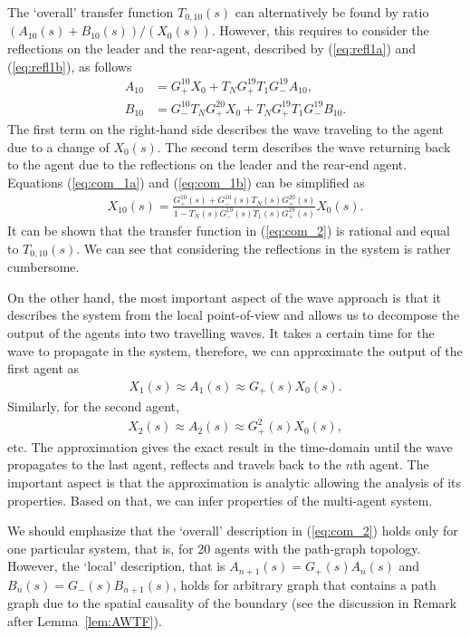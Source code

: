 \documentclass[10pt,twocolumn,twoside]{IEEEtran}
\theoremstyle{definition}
\begin{document}
The `overall' transfer function $T_{0,10}(s)$ can alternatively be found by ratio $(A_{10}(s)+B_{10}(s))/(X_0(s))$. However, this requires to consider the reflections on the leader and the rear-agent, described by (\ref{eq:refl1a}) and (\ref{eq:refl1b}), as follows
\begin{align}
A_{10} &= G_+^{10}X_0+ T_N G_+^{19} T_1 G_-^{19}A_{10},\label{eq:com_1a}\\
  B_{10} &= G_-^{10}T_N G_+^{20}X_0+ T_N G_+^{19} T_1 G_-^{19}B_{10}.\label{eq:com_1b}
\end{align}
The first term on the right-hand side describes the wave traveling to the agent due to a change of $X_0(s)$. The second term describes the wave returning back to the agent due to the reflections on the leader and the rear-end agent. Equations (\ref{eq:com_1a}) and (\ref{eq:com_1b}) can be simplified as
\begin{align}
  X_{10}(s) = \frac{G_+^{10}(s) + G_-^{10}(s)T_N(s)G_+^{20}(s)}{1-T_N(s)G_-^{19}(s)T_1(s)G_+^{19}(s)}X_0(s).\label{eq:com_2}
\end{align}
It can be shown that the transfer function in (\ref{eq:com_2}) is rational and equal to $T_{0,10}(s)$. We can see that considering the reflections in the system is rather cumbersome.

On the other hand, the most important aspect of the wave approach is that it describes the system from the local point-of-view and allows us to decompose the output of the agents into two travelling waves. It takes a certain time for the wave to propagate in the system, therefore, we can approximate the output of the first agent as
\begin{align}
  X_1(s) \approx A_1(s) \approx G_+(s)X_0(s).\label{eq:com_3}
\end{align}
Similarly, for the second agent,
\begin{align}
  X_2(s) \approx A_2(s) \approx G_+^2(s)X_0(s),\label{eq:com_4}
\end{align}
etc. The approximation gives the exact result in the time-domain until the wave propagates to the last agent, reflects and travels back to the $n$th agent. The important aspect is that the approximation is analytic allowing the analysis of its properties. Based on that, we can infer properties of the multi-agent system.

We should emphasize that the `overall' description in (\ref{eq:com_2}) holds only for one particular system, that is, for 20 agents with the path-graph topology. However, the `local' description, that is $A_{n+1}(s) = G_{+}(s)A_{n}(s)$ and $B_{n}(s) = G_{-}(s)B_{n+1}(s)$, holds for arbitrary graph that contains a path graph due to the spatial causality of the boundary (see the discussion in Remark after Lemma~\ref{lem:AWTF}).
\end{document}
